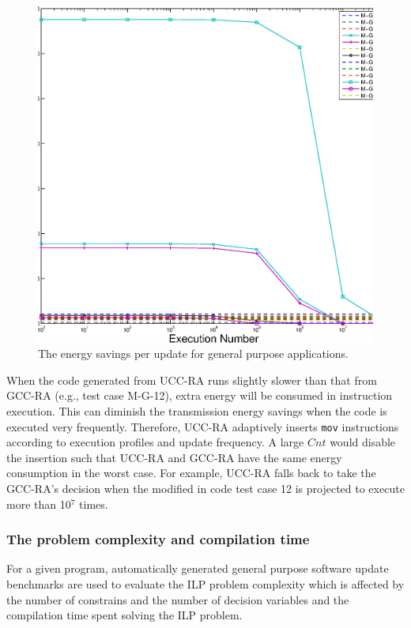 \begin{figure}[htbp]
\centering
\includegraphics[scale=0.45]{figures/energy.eps}
\caption{The energy savings per update for general purpose applications.}
\label{fexp.energy}
\end{figure}

When the code generated from UCC-RA runs slightly slower than that from GCC-RA (e.g., test case M-G-12), extra energy will be consumed in instruction execution. This can diminish the transmission energy savings when the code is executed very frequently. Therefore, UCC-RA adaptively inserts {\tt mov} instructions according to execution profiles and update frequency. A large $Cnt$ would disable the insertion such that UCC-RA and GCC-RA have the same energy consumption in the worst case. For example, UCC-RA falls back to take the GCC-RA's decision when the modified in code test case 12 is projected to execute more than 10$^7$ times.



\subsubsection{The problem complexity and compilation time}
For a given program, automatically generated general purpose software update
benchmarks are used to evaluate the ILP problem
complexity which is affected by the number of constrains and the number of
decision variables and the compilation time spent solving the ILP problem.

